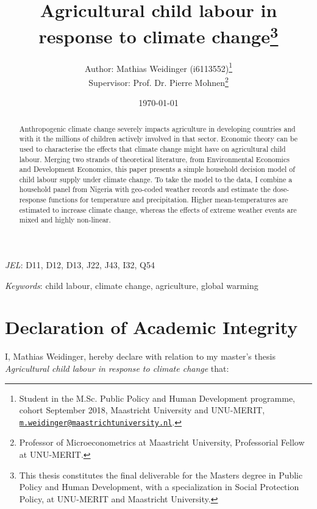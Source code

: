 \documentclass[a4paper,12pt]{article}
\title{Agricultural child labour in response to climate change\footnote{This thesis constitutes the final deliverable for the Masters degree in Public Policy and Human Development, with a specialization in Social Protection Policy, at UNU-MERIT and Maastricht University.}}
\author{Author: Mathias Weidinger (i6113552)\footnote{Student in the M.Sc. Public Policy and Human Development programme, cohort September 2018, Maastricht University and UNU-MERIT, \href{mailto:m.weidinger@maastrichtuniversit.nl}{\texttt{m.weidinger@maastrichtuniversity.nl}}.}\\ Supervisor: Prof. Dr. Pierre Mohnen\footnote{Professor of Microeconometrics at Maastricht University, Professorial Fellow at UNU-MERIT.}}
\date{\today %
}
\theoremstyle{plain}
\theoremstyle{definition}
\theoremstyle{definition}
\theoremstyle{definition}
\theoremstyle{definition}
\begin{document}
\maketitle

\begin{abstract}
Anthropogenic climate change severely impacts agriculture in developing countries and with it the millions of children actively involved in that sector. Economic theory can be used to characterise the effects that climate change might have on agricultural child labour. Merging two strands of theoretical literature, from Environmental Economics and Development Economics, this paper presents a simple household decision model of child labour supply under climate change. To take the model to the data, I combine a household panel from Nigeria with geo-coded weather records and estimate the dose-response functions for temperature and precipitation. Higher mean-temperatures are estimated to increase climate change, whereas the effects of extreme weather events are mixed and highly non-linear.

\end{abstract}

\textit{JEL}: D11, D12, D13, J22, J43, I32, Q54

\textit{Keywords}: child labour, climate change, agriculture, global warming

\clearpage


\section*{Declaration of Academic Integrity}
I, Mathias Weidinger, hereby declare with relation to my master's thesis
\textit{Agricultural child labour in response to climate change} that:
\end{document}
